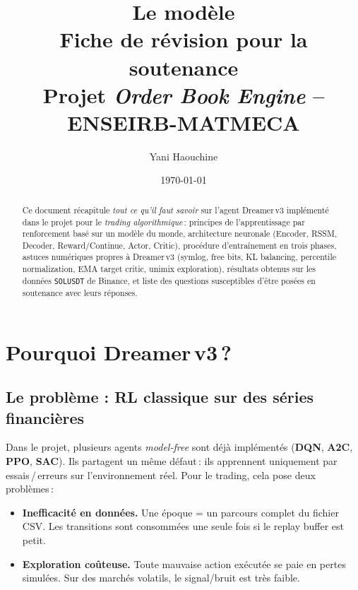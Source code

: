 \documentclass[11pt,a4paper]{article}
\title{\bfseries Le modèle \dreamer{} \\
       \large Fiche de révision pour la soutenance \\
       \normalsize Projet \emph{Order Book Engine} -- ENSEIRB-MATMECA}
\author{Yani Haouchine}
\date{\today}
\newcommand{\dreamer}{Dreamer\,v3}
\newcommand{\rssm}{RSSM}
\newcommand{\bluebf}[1]{\textbf{\color{enseirbblue}#1}}
\begin{document}
\maketitle

\begin{abstract}
Ce document récapitule \emph{tout ce qu'il faut savoir} sur l'agent \dreamer{}
implémenté dans le projet pour le \emph{trading algorithmique}\,: principes de
l'apprentissage par renforcement basé sur un modèle du monde, architecture
neuronale (Encoder, \rssm, Decoder, Reward/Continue, Actor, Critic),
procédure d'entraînement en trois phases, astuces numériques propres à
\dreamer{} (symlog, free bits, KL balancing, percentile normalization, EMA
target critic, unimix exploration), résultats obtenus sur les données
\texttt{SOLUSDT} de Binance, et liste des questions susceptibles d'être
posées en soutenance avec leurs réponses.
\end{abstract}

\tableofcontents
\bigskip

\section{Pourquoi \dreamer{}\,?}

\subsection{Le problème : RL classique sur des séries financières}
Dans le projet, plusieurs agents \emph{model-free} sont déjà implémentés
(\textbf{DQN}, \textbf{A2C}, \textbf{PPO}, \textbf{SAC}). Ils partagent un
même défaut\,: ils apprennent uniquement par essais\,/\,erreurs sur
l'environnement réel. Pour le trading, cela pose deux problèmes\,:
\begin{itemize}
    \item \bluebf{Inefficacité en données.} Une époque = un parcours complet
          du fichier CSV. Les transitions sont consommées une seule fois si
          le replay buffer est petit.
    \item \bluebf{Exploration coûteuse.} Toute mauvaise action exécutée se
          paie en pertes simulées. Sur des marchés volatils, le signal/bruit
          est très faible.
\end{itemize}
\end{document}
